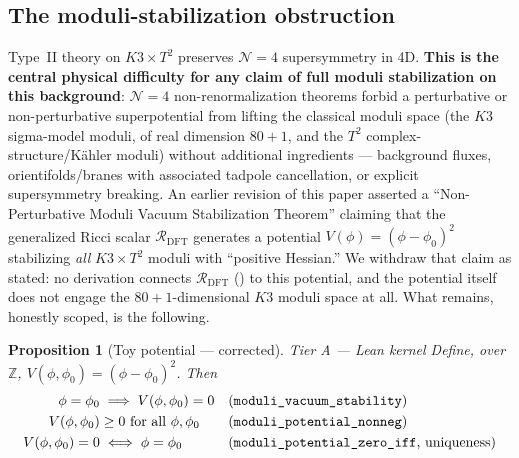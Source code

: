 \documentclass[11pt,a4paper]{article}
\newtheorem{proposition}[theorem]{Proposition}
\theoremstyle{remark}
\newcommand{\tierA}{\colorbox{green!15}{\textsf{\scriptsize Tier A --- Lean kernel}}}
\begin{document}
\subsection{The moduli-stabilization obstruction}
\label{sec:moduli-obstruction}
Type~II theory on $K3\times T^2$ preserves $\mathcal{N}=4$ supersymmetry in 4D. \textbf{This is the
central physical difficulty for any claim of full moduli stabilization on this background}: $\mathcal
N=4$ non-renormalization theorems forbid a perturbative or non-perturbative superpotential from
lifting the classical moduli space (the $K3$ sigma-model moduli, of real dimension $80+1$, and the
$T^2$ complex-structure/K\"ahler moduli) without additional ingredients --- background fluxes,
orientifolds/branes with associated tadpole cancellation, or explicit supersymmetry breaking. An
earlier revision of this paper asserted a ``Non-Perturbative Moduli Vacuum Stabilization Theorem''
claiming that the generalized Ricci scalar $\mathcal{R}_{\mathrm{DFT}}$ generates a potential
$V(\phi)=(\phi-\phi_0)^2$ stabilizing \emph{all} $K3\times T^2$ moduli with ``positive Hessian.'' We
withdraw that claim as stated: no derivation connects $\mathcal{R}_{\mathrm{DFT}}$ ()
to this potential, and the potential itself does not engage the $80+1$-dimensional $K3$ moduli space
at all. What remains, honestly scoped, is the following.

\begin{proposition}[Toy potential --- corrected] \label{prop:toypotential} \tierA
Define, over $\mathbb{Z}$, $V(\phi,\phi_0) = (\phi-\phi_0)^2$. Then
\begin{align}
  \phi=\phi_0 &\implies V(\phi,\phi_0)=0 && \text{(\texttt{moduli\_vacuum\_stability})}\\
  V(\phi,\phi_0) &\ge 0 \text{ for all } \phi,\phi_0 && \text{(\texttt{moduli\_potential\_nonneg})}\\
  V(\phi,\phi_0) = 0 &\iff \phi=\phi_0 && \text{(\texttt{moduli\_potential\_zero\_iff}, uniqueness)}
\end{align}
\end{proposition}
\end{document}

